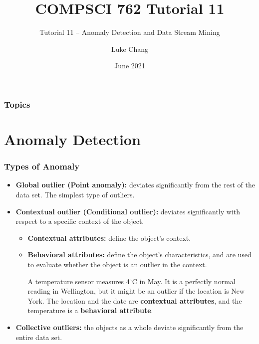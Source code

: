 \documentclass[aspectratio=169, 10pt]{beamer}
\title{COMPSCI 762 Tutorial 11}
\subtitle{Tutorial 11 -- Anomaly Detection and Data Stream Mining}
\author{Luke Chang}
\institute{The University of Auckland}
\date{June 2021}
\begin{document}
\frame{\titlepage}

\begin{frame}
    \frametitle{Topics}

    \tableofcontents
        
\end{frame}

\section{Anomaly Detection}
\begin{frame}
\frametitle{Types of Anomaly}

\begin{itemize}
    \item \textbf{Global outlier (Point anomaly):} deviates significantly from the rest of the data set. 
    The simplest type of outliers.
    \item \textbf{Contextual outlier (Conditional outlier):} deviates significantly with respect to a specific context of the object.
        \begin{itemize}
            \item \textbf{Contextual attributes:} define the object’s context.
            \item \textbf{Behavioral attributes:} define the object’s characteristics, and are used to evaluate
            whether the object is an outlier in the context.
        \begin{example}
            A temperature sensor measures 4$^{\circ}$C in May. It is a perfectly normal reading in Wellington, but it might be an outlier if the location is New York.
            The location and the date are \textbf{contextual attributes}, and the temperature is a \textbf{behavioral attribute}.
        \end{example}
    \end{itemize}
    \item \textbf{Collective outliers:} the objects as a whole deviate significantly from the entire data set.
\end{itemize}

\end{frame}
\end{document}
